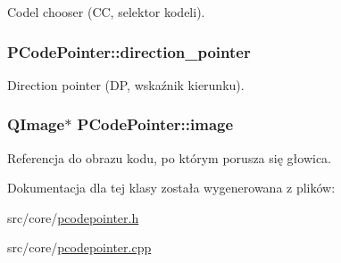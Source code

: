 Codel chooser (CC, selektor kodeli). \hypertarget{classPCodePointer_b285be0011b9b5c8b35bd1ba27ee935f}{
\subsubsection[{direction\_\-pointer}]{ {\bf PCodePointer::direction\_\-pointer}}}
\label{classPCodePointer_b285be0011b9b5c8b35bd1ba27ee935f}


Direction pointer (DP, wskaźnik kierunku). \hypertarget{classPCodePointer_9f6689e6425046abd85001f915ba1221}{
\subsubsection[{image}]{\setlength{\rightskip}{0pt plus 5cm}QImage$\ast$ {\bf PCodePointer::image}}}
\label{classPCodePointer_9f6689e6425046abd85001f915ba1221}


Referencja do obrazu kodu, po którym porusza się głowica. 

Dokumentacja dla tej klasy została wygenerowana z plików:\begin{CompactItemize}
\item 
src/core/\hyperlink{pcodepointer_8h}{pcodepointer.h}\item 
src/core/\hyperlink{pcodepointer_8cpp}{pcodepointer.cpp}\end{CompactItemize}

